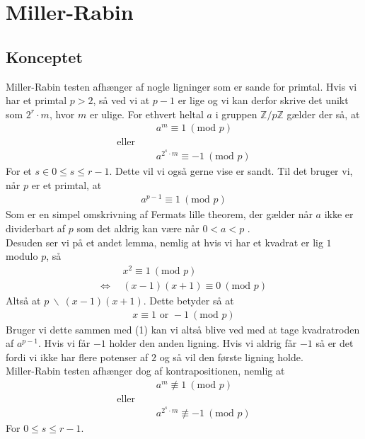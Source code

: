 \documentclass[12pt]{article}
\author{Nikolaj Dybdahl Rathcke}
\begin{document}
\section{Miller-Rabin}
\subsection*{Konceptet}
Miller-Rabin testen afhænger af nogle ligninger som er sande for primtal. Hvis vi har et primtal $p>2$, så ved vi at $p-1$ er lige og vi kan derfor skrive det unikt som $2^r\cdot m$, hvor $m$ er ulige. For ethvert heltal $a$ i gruppen $\mathbb{Z}/p\mathbb{Z}$ gælder der så, at
\begin{align*}
&a^m\equiv 1 \ (\mbox{mod }p) \\
\mbox{eller}\ \ \ \ \ \ &\ \\
&a^{2^s\cdot m}\equiv -1 \ (\mbox{mod }p)
\end{align*}
For et $s\in 0\leq s\leq r-1$. Dette vil vi også gerne vise er sandt. Til det bruger vi, når $p$ er et primtal, at
\begin{align}
a^{p-1}\equiv 1 \ (\mbox{mod }p)
\end{align}
Som er en simpel omskrivning af Fermats lille theorem, der gælder når $a$ ikke er dividerbart af $p$ som det aldrig kan være når $0<a<p$	.\\
Desuden ser vi på et andet lemma, nemlig at hvis vi har et kvadrat er lig $1$ modulo $p$, så
\begin{align*}
&x^2\equiv 1 \ (\mbox{mod }p) \\
\Leftrightarrow\ \ &(x-1)(x+1)\equiv 0 \ (\mbox{mod }p)
\end{align*}
Altså at $p\ \backslash\ (x-1)(x+1)$. Dette betyder så at
\begin{align*}
x\equiv 1\mbox{ or }-1 \ (\mbox{mod }p)
\end{align*}
Bruger vi dette sammen med (1) kan vi altså blive ved med at tage kvadratroden af $a^{p-1}$. Hvis vi får $-1$ holder den anden ligning. Hvis vi aldrig får $-1$ så er det fordi vi ikke har flere potenser af $2$ og så vil den første ligning holde.\\
Miller-Rabin testen afhænger dog af kontrapositionen, nemlig at
\begin{align*}
&a^m\not\equiv 1 \ (\mbox{mod }p) \\
\mbox{eller}\ \ \ \ \ \ &\ \\
&a^{2^s\cdot m}\not\equiv -1 \ (\mbox{mod }p)
\end{align*}
For $0\leq s\leq r-1$. 
\end{document}
